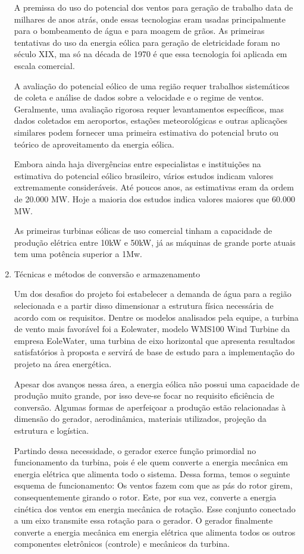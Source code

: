\documentclass[12pt,openright,oneside,a4paper,brazil]{abntex2}
\begin{document}
\begin{enumerate}
A premissa do uso do potencial dos ventos para geração de trabalho data de milhares de anos atrás, onde essas tecnologias eram usadas principalmente para o bombeamento de água e para moagem de grãos. As primeiras tentativas do uso da energia eólica para geração de eletricidade foram no século XIX, ma só na década de 1970 é que essa tecnologia foi aplicada em escala comercial.


 A avaliação do potencial eólico de uma região requer trabalhos sistemáticos de coleta e análise de dados sobre a velocidade e o regime de ventos. Geralmente, uma avaliação rigorosa requer levantamentos específicos, mas dados coletados em aeroportos, estações meteorológicas e outras aplicações similares podem fornecer uma primeira estimativa do potencial bruto ou teórico de aproveitamento da energia eólica.


Embora ainda haja divergências entre especialistas e instituições na estimativa do potencial eólico brasileiro, vários estudos indicam valores extremamente consideráveis. Até poucos anos, as estimativas eram da ordem de 20.000 MW. Hoje a maioria dos estudos indica valores maiores que 60.000 MW.

As primeiras turbinas eólicas de uso comercial tinham a capacidade de produção elétrica entre 10kW e 50kW, já as máquinas de grande porte atuais tem uma potência superior a 1Mw. 

\item Técnicas e métodos de conversão e armazenamento

Um dos desafios do projeto foi estabelecer a demanda de água para a região selecionada e a partir disso dimensionar a estrutura física necessária de acordo com os requisitos. Dentre os modelos analisados pela equipe, a turbina de vento mais favorável foi a Eolewater, modelo WMS100 Wind Turbine da empresa EoleWater, uma turbina de eixo horizontal que apresenta resultados satisfatórios à proposta e servirá de base de estudo para a implementação do projeto na área energética.

	Apesar dos avanços nessa área, a energia eólica não possui uma capacidade de produção muito grande, por isso deve-se focar no requisito eficiência de conversão. Algumas formas de aperfeiçoar a produção estão relacionadas à dimensão do gerador, aerodinâmica, materiais utilizados, projeção da estrutura e logística.

	 Partindo dessa necessidade, o gerador exerce função primordial no funcionamento da turbina, pois é ele quem converte a energia mecânica em energia elétrica que alimenta todo o sistema. Dessa forma, temos o seguinte esquema de funcionamento: Os ventos fazem com que as pás do rotor girem, consequentemente girando o rotor. Este, por sua vez, converte a energia cinética dos ventos em energia mecânica de rotação. Esse conjunto conectado a um eixo transmite essa rotação para o gerador. O gerador finalmente converte a energia mecânica em energia elétrica que alimenta todos os outros componentes eletrônicos (controle) e mecânicos da turbina. 


\end{enumerate}
\end{document}

